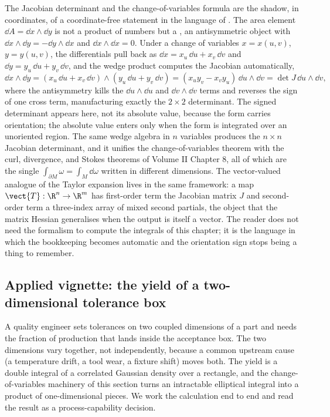\begin{mastery}
The Jacobian determinant and the change-of-variables formula are the
shadow, in coordinates, of a coordinate-free statement in the
language of . The area element $\dd A =
\dd x\wedge\dd y$ is not a product of numbers but a , an antisymmetric object with $\dd x\wedge\dd y = -\dd
y\wedge\dd x$ and $\dd x\wedge\dd x = 0$. Under a change of variables
$x = x(u, v)$, $y = y(u, v)$, the differentials pull back as $\dd x =
x_{u}\,\dd u + x_{v}\,\dd v$ and $\dd y = y_{u}\,\dd u + y_{v}\,\dd
v$, and the wedge product computes the Jacobian automatically,
\[
\dd x\wedge\dd y = (x_{u}\,\dd u + x_{v}\,\dd v)\wedge
(y_{u}\,\dd u + y_{v}\,\dd v)
= (x_{u} y_{v} - x_{v} y_{u})\,\dd u\wedge\dd v
= \det J\,\dd u\wedge\dd v,
\]
where the antisymmetry kills the $\dd u\wedge\dd u$ and $\dd v\wedge
\dd v$ terms and reverses the sign of one cross term, manufacturing
exactly the $2\times 2$ determinant. The signed determinant appears
here, not its absolute value, because the form carries orientation;
the absolute value enters only when the form is integrated over an
unoriented region. The same wedge algebra in $n$ variables produces
the $n\times n$ Jacobian determinant, and it unifies the
change-of-variables theorem with the curl, divergence, and Stokes
theorems of Volume II Chapter 8, all of which are the single
 $\int_{\partial M}\omega =
\int_{M}\dd\omega$ written in different dimensions. The vector-valued
analogue of the Taylor expansion lives in the same framework: a map
$\vect{T} : \R^{n}\to\R^{m}$ has first-order term the Jacobian
matrix $J$ and second-order term a three-index array of mixed second
partials, the object that the matrix Hessian generalises when the
output is itself a vector. The reader does not need the formalism to
compute the integrals of this chapter; it is the language in which
the bookkeeping becomes automatic and the orientation sign stops
being a thing to remember.
\end{mastery}

\subsection{Applied vignette: the yield of a two-dimensional tolerance
box}

A quality engineer sets tolerances on two coupled dimensions of a part
and needs the fraction of production that lands inside the acceptance
box. The two dimensions vary together, not independently, because a
common upstream cause (a temperature drift, a tool wear, a fixture
shift) moves both. The yield is a double integral of a correlated
Gaussian density over a rectangle, and the change-of-variables machinery
of this section turns an intractable elliptical integral into a product
of one-dimensional pieces. We work the calculation end to end and read
the result as a process-capability decision.


